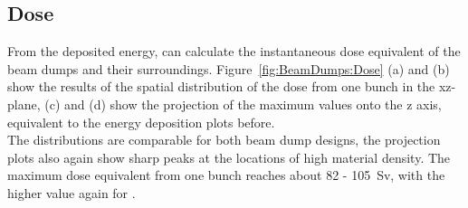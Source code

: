 \subsection{Dose}
\label{BeamDumps:sim_surrounding:Dose} 
From the deposited energy, \fluka can calculate the instantaneous dose equivalent of the beam dumps and their surroundings.
Figure~\ref{fig:BeamDumps:Dose} (a) and (b) show the \fluka results of the spatial distribution of the dose from one bunch in the xz-plane, (c) and (d) show the projection of the maximum values onto the z axis, equivalent to the energy deposition plots before.
\\The distributions are comparable for both beam dump designs, the projection plots also again show sharp peaks at the locations of high material density.
The maximum dose equivalent from one bunch reaches about 82 - \SI{105}{\sievert}, with the higher value again for \designtwo.
